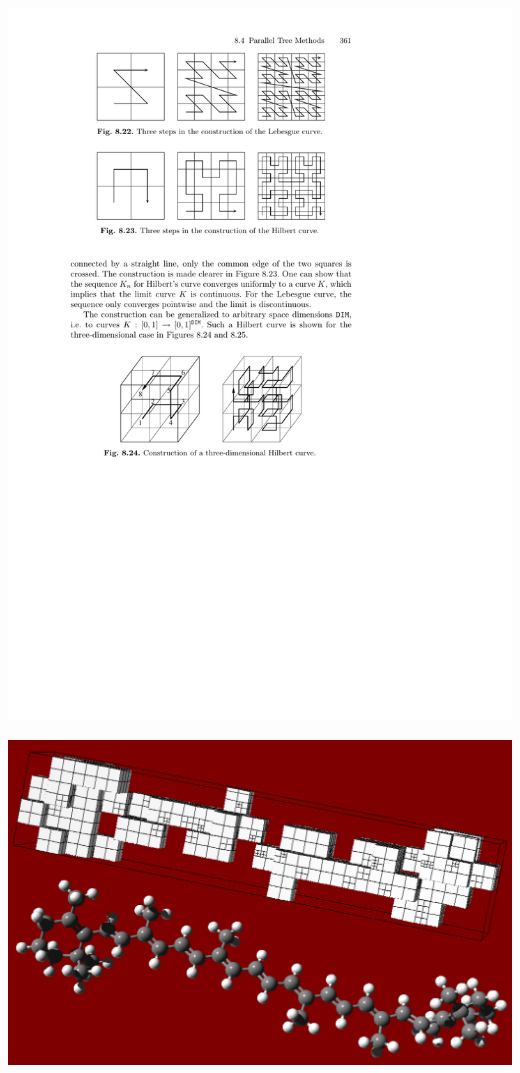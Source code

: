 \documentclass[mathserif]{beamer}
\begin{document}
\begin{frame}
\begin{minipage}[b]{0.40\linewidth}
	\includegraphics[viewport = 105 325 375 435, scale=0.6, clip]{figures/hilbertCurve.pdf}
    \end{minipage}
    \hfill
    \begin{minipage}[b]{0.4\linewidth}
	\includegraphics[angle=90, scale=0.2]{figures/caroteneGrid.pdf}
    \end{minipage}
\end{frame}
\end{document}
